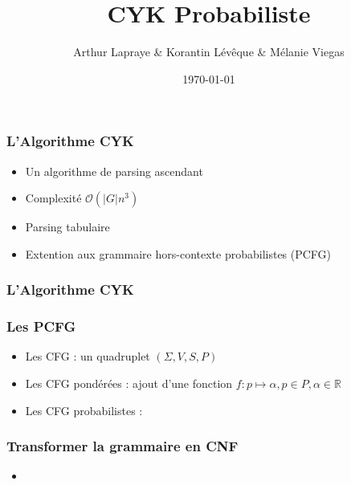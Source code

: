 \documentclass{beamer}
\begin{document}
\title{CYK Probabiliste}  %
\author{ Arthur Lapraye \& Korantin Lévêque \& Mélanie Viegas }

\date{\today}


\begin{frame}
 \maketitle
\end{frame}

\begin{frame}
\frametitle{L'Algorithme CYK}
\begin{itemize}
  \item<1-4>{Un algorithme de parsing ascendant}
  \item<2-4>{Complexité $\mathcal{O}(|G|n^3) $ } %
  \item<3-4>{Parsing tabulaire}
  \item<4>{Extention aux grammaire hors-contexte probabilistes (PCFG)}
 \end{itemize}
 
\end{frame}

\begin{frame}
 \frametitle{L'Algorithme CYK}

\end{frame}

\begin{frame}
 \frametitle{Les PCFG}
 \begin{itemize}
  \item<1-4>{Les CFG : un quadruplet $(\Sigma,V,S,P)$ }
  \item<2-4>{Les CFG pondérées : ajout d'une fonction $ f : p \mapsto \alpha, p \in P, \alpha \in \mathbb{R} $ }
  \item<3-4>{Les CFG probabilistes : }
 \end{itemize}

\end{frame}


\begin{frame}
 \frametitle{Transformer la grammaire en CNF}
 \begin{itemize}
  \item<1>
 \end{itemize}

 
\end{frame}
\end{document}
